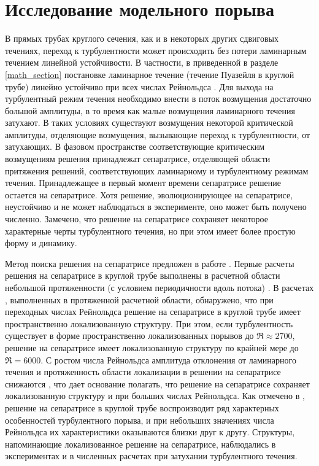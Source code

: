 
\chapter{Исследование модельного порыва}


В прямых трубах круглого сечения, как и в некоторых других сдвиговых течениях, переход к турбулентности может происходить без потери ламинарным течением линейной устойчивости. В частности, в приведенной в разделе \ref{math_section} постановке ламинарное течение (течение Пуазейля в круглой трубе) линейно устойчиво при всех числах Рейнольдса \cite{Kerswell2005}. Для выхода на турбулентный режим течения необходимо внести в поток возмущения достаточно большой амплитуды, в то время как малые возмущения ламинарного течения затухают. В таких условиях существуют возмущения некоторой критической амплитуды, отделяющие возмущения, вызывающие переход к турбулентности, от затухающих. В фазовом пространстве соответствующие критическим возмущениям решения принадлежат сепаратрисе, отделяющей области притяжения решений, соответствующих ламинарному и турбулентному режимам течения. Принадлежащее в первый момент времени сепаратрисе решение остается на сепаратрисе. Хотя решение, эволюционирующее на сепаратрисе, неустойчиво и не может наблюдаться в эксперименте, оно может быть получено численно. Замечено, что решение на сепаратрисе сохраняет некоторое характерные черты турбулентного течения, но при этом имеет более простую форму и динамику. 

Метод поиска решения на сепаратрисе предложен в работе \cite{Skufca2006}. Первые расчеты решения на сепаратрисе в круглой трубе выполнены в расчетной области небольшой протяженности (с условием периодичности вдоль потока) \cite{Schneider2007}. В расчетах \cite{Mellibovsky2009transition, Duguet2010}, выполненных в протяженной расчетной области, обнаружено, что при переходных числах Рейнольдса решение на сепаратрисе в круглой трубе имеет пространственно локализованную структуру. При этом, если турбулентность существует в форме пространственно локализованных порывов до $\Re \approx 2700$, решение на сепаратрисе имеет локализованную структуру по крайней мере до $\Re = 6000$. С ростом числа Рейнольдса амплитуда отклонения от ламинарного течения и протяженность области локализации в решении на сепаратрисе снижаются \cite{Duguet2010}, что дает основание полагать, что решение на сепаратрисе сохраняет локализованную структуру и при больших числах Рейнольдса. Как отмечено в \cite{Duguet2010, Avila2013}, решение на сепаратрисе в круглой трубе воспроизводит ряд характерных особенностей турбулентного порыва, и при небольших значениях числа Рейнольдса их характеристики оказываются близки друг к другу. Структуры, напоминающие локализованное решение на сепаратрисе, наблюдались в экспериментах \cite{deLozar2012} и в численных расчетах \cite{Manneville2011} при затухании турбулентного течения. 

